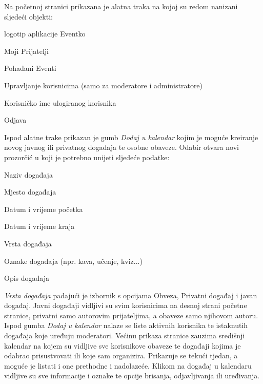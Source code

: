 		\indent Na početnoj stranici prikazana je alatna traka na kojoj su redom nanizani sljedeći objekti:
		
		\begin{packed_item}
			\item logotip aplikacije Eventko
			\item Moji Prijatelji
			\item Pohađani Eventi
			\item Upravljanje korisnicima (samo za moderatore i administratore)
			\item Korisničko ime ulogiranog korisnika
			\item Odjava
		\end{packed_item}
	
		\indent Ispod alatne trake prikazan je gumb \textit{Dodaj u kalendar} kojim je moguće kreiranje novog javnog ili privatnog događaja te osobne obaveze. Odabir otvara novi prozorčić u koji je potrebno unijeti sljedeće podatke:
		
		\begin{packed_item}
			\item Naziv događaja
			\item Mjesto događaja
			\item Datum i vrijeme početka
			\item Datum i vrijeme kraja
			\item Vrsta događaja
			\item Oznake događaja (npr. kava, učenje, kviz...)
			\item Opis događaja
		\end{packed_item}
	
		\indent \textit{Vrsta događaja} padajući je izbornik s opcijama Obveza, Privatni događaj i javan događaj. Javni događaji vidljivi su svim korisnicima na desnoj strani početne stranice, privatni samo autorovim prijateljima, a obaveze samo njihovom autoru. \\
	
		\indent Ispod gumba \textit{Dodaj u kalendar} nalaze se liste aktivnih korisnika te istaknutih događaja koje uređuju moderatori. Većinu prikaza stranice zauzima središnji kalendar na kojem su vidljive sve korisnikove obaveze te događaji kojima je odabrao prisustvovati ili koje sam organizira. Prikazuje se tekući tjedan, a moguće je listati i one prethodne i nadolazeće. Klikom na događaj u kalendaru vidljive su sve informacije i oznake te opcije brisanja, odjavljivanja ili uređivanja. \\
		
